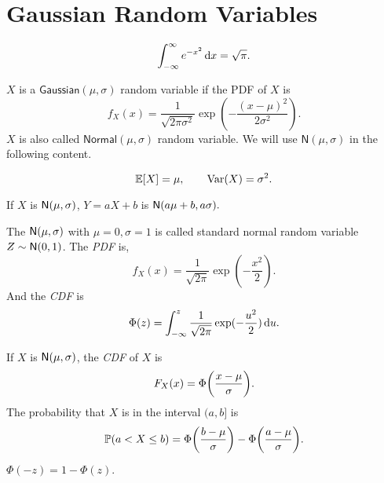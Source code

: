 \section{Gaussian Random Variables}
\begin{theorem}
    \[\int_{-\infty}^{\infty}e^{-x^2}\,\mathrm{d} x=\sqrt{\pi}.\]
\end{theorem}

\begin{definition}
    $X$ is a $\mathsf{Gaussian}(\mu, \sigma)$ random variable if the \textrm{PDF} of $X$ is 
    \[f_X(x)=\frac{1}{\sqrt{2\pi\sigma^2}}\exp(-\frac{(x-\mu)^2}{2\sigma^2}).\]
    $X$ is also called $\mathsf{Normal}(\mu,\sigma)$ random variable. We will use $\mathsf{N}(\mu, \sigma)$ in the following content.
\end{definition}

\begin{theorem}
    \[\E{X} = \mu, \qquad \Var(X) = \sigma^2.\]
\end{theorem}

\begin{theorem}
    If $X$ is $\mathsf{N}(\mu,\sigma)$, $Y=aX+b$ is $\mathsf{N}(a\mu+b,a\sigma).$
\end{theorem}

\begin{theorem}
    The $\mathsf{N}(\mu,\sigma)$ with $\mu=0, \sigma=1$ is called standard normal random variable $Z\sim\mathsf{N}(0,1)$. The \emph{PDF} is,
    \[f_X(x)=\frac{1}{\sqrt{2\pi}}\exp(-\frac{x^2}{2}).\]
    And the \emph{CDF} is 
    \[\Phi(z)=\int_{-\infty}^{z}\frac{1}{\sqrt{2\pi}}\exp(-\frac{u^2}{2})\,\mathrm{d} u.\]
\end{theorem}

\begin{theorem}
    If $X$ is $\mathsf{N}(\mu,\sigma)$, the \emph{CDF} of $X$ is 
    \[F_X(x)=\Phi\parens*{\frac{x-\mu}{\sigma}}.\]
    The probability that $X$ is in the interval \emph{$(a,b]$} is
    \[\P{a<X\leq b}=\Phi\parens*{\frac{b-\mu}{\sigma}}-\Phi\parens*{\frac{a-\mu}{\sigma}}.\]
\end{theorem}

\begin{theorem}
    $\Phi(-z)=1-\Phi(z).$
\end{theorem}


